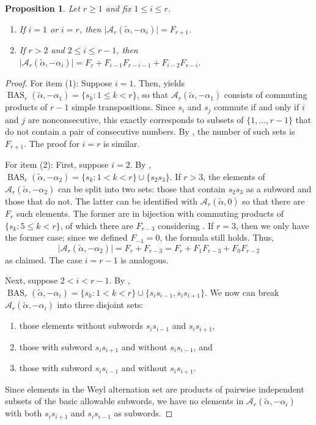 \documentclass{amsart}
\newtheorem{proposition}[theorem]{Proposition}
\theoremstyle{definition}
\DeclareMathOperator{\BAS}{BAS}
\newcommand{\hroot}{\tilde{\alpha}}
\begin{document}
\begin{proposition}\label{prop:EnumerateNegativeSimple}
 Let $r \geq 1$ and fix $1 \leq i \leq r$.
  \begin{enumerate}
     \item If $i = 1$ or $i = r$, then $\vert \mathcal{A}_r(\hroot,-\alpha_i) \vert = F_{r+1}$.
     \item 
     If $r > 2$ and $2 \leq i \leq r-1$, then  $\vert \mathcal{A}_r(\hroot,-\alpha_i) \vert = F_{r} + F_{i-1}F_{r-i-1} + F_{i-2}F_{r-i}$.
 \end{enumerate}
\end{proposition}
\begin{proof} For item (1):
Suppose $i = 1$. Then,  yields  $\BAS_r(\hroot,-\alpha_1) = \{s_k : 1 \leq k < r\}$, so that $\mathcal{A}_r(\hroot,-\alpha_1)$ consists of commuting products of $r-1$ simple transpositions. 
{Since $s_i$ and $s_j$ commute if and only if $i$ and $j$ are nonconsecutive, this exactly corresponds to subsets of $\{1,\ldots,r-1\}$ that do not contain a pair of consecutive numbers.} By , the number of such sets is $F_{r+1}$.  The proof for $i=r$ is similar.

 For item (2): First, suppose $i = 2$.  By , $\BAS_r(\hroot,-\alpha_2) = \{s_k : 1 < k < r\} \cup \{s_{2}s_{3}\}$. If $r > 3$, the elements of $\mathcal{A}_r(\hroot,-\alpha_2)$ can be split into two sets: those that contain $s_2s_3$ as a subword and those that do not. The latter can be identified with $\mathcal{A}_r(\hroot,0)$ so that there are $F_{r}$ such elements. The former are in bijection with commuting products of $\{s_k: 5 \le k < r\}$, of which there are $F_{r-3}$ considering . If $r = 3$, then we only have the former case; since we defined $F_{-1} = 0$, the formula still holds. 
 Thus,
 \[\vert\mathcal{A}_r(\hroot,-\alpha_2)\vert=F_r+F_{r-3}=F_r+F_1F_{r-3}+F_0F_{r-2}\]
 as claimed. 
 The case $i = r-1$ is analogous.

Next, suppose $2 < i < r-1$. By , $\BAS_r(\hroot,-\alpha_i) = \{s_k : 1 < k < r\} \cup \{s_{i}s_{i-1}, s_is_{i+1}\}$. 
We now can break $\mathcal{A}_r(\hroot,-\alpha_i)$ into three disjoint sets:
\begin{enumerate}
    \item those elements without subwords $s_is_{i-1}$ and $s_{i}s_{i+1}$, 
    \item those with subword $s_is_{i+1}$ and without $s_{i}s_{i-1}$, and
    \item those with subword $s_{i}s_{i-1}$ and without $s_{i}s_{i+1}$.
    \end{enumerate}
Since elements in the Weyl alternation set are products of pairwise independent subsets of the basic allowable subwords, we have no elements in $\mathcal{A}_r(\hroot,-\alpha_i)$ with both $s_is_{i+1}$ and $s_{i}s_{i-1}$ as subwords. 


\end{proof}
\end{document}

